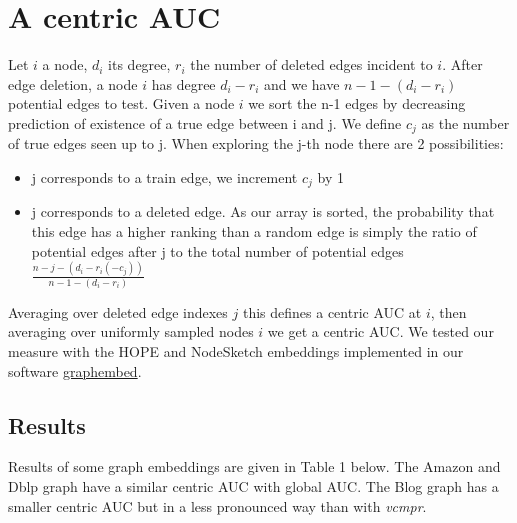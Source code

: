 \documentclass{article}
\begin{document}
\section{A centric AUC}

Let $i$ a node, $d_{i}$ its degree, $r_{i}$ the number of deleted edges incident to $i$.
After edge deletion, a node $i$ has degree $d_{i} - r_{i}$ and we have  $ n - 1 - (d_{i} - r_{i})$  potential edges to test.
Given a node $i$ we sort the n-1 edges by decreasing prediction of existence of a true edge between i and j. We define $c_{j}$  as the number of true edges seen up to j.
When exploring the j-th node there are 2 possibilities:
\begin{itemize}
    \item j corresponds to a train edge, we increment $c_{j}$ by 1
    \item j corresponds to a deleted edge. As our array is sorted, the probability that this edge has a higher
          ranking than a random edge is simply the ratio of potential edges after j to
          the total number of potential edges $ \frac{n-j-(d_{i}-r_{i}(-c_{j}))}{n-1-(d_{i}-r_{i})}$
\end{itemize}
Averaging over deleted edge indexes $j$ this defines a centric AUC at  $i$, then averaging over uniformly sampled nodes $i$ we get a centric AUC.
We tested our measure with the HOPE \citep{Ou2016asymmetric} and NodeSketch \citep{Yang2019nodesketch} embeddings implemented
in our software \href{https://github.com/jean-pierreBoth/graphembed}{\color{blue}graphembed}.

\subsection{Results}

Results of some graph embeddings are given in Table 1 below.
The Amazon and Dblp graph have a similar centric AUC with global AUC. The Blog graph has a smaller centric AUC but in a less pronounced way than with \textit{vcmpr}.
\end{document}
